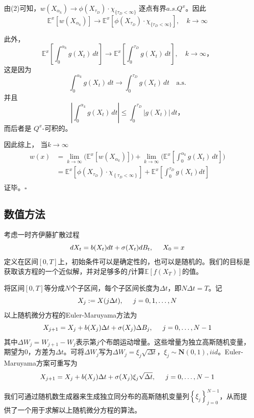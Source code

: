 \documentclass[UTF8，12pt]{ctexart}
\numberwithin{equation}{section}
\newcommand{\qed}{\hfill \ensuremath{\square}}
\begin{document}
由(2)可知，$w(X_{\alpha_k}) \to \phi(X_{\tau_D}) \cdot \chi_{\{\tau_D < \infty\}}$ 逐点有界$a.s.Q^x$。因此
\[
\mathbb{E}^x[w(X_{\alpha_k})] \to \mathbb{E}^x[\phi(X_{\tau_D}) \cdot \chi_{\{\tau_D < \infty\}}], \quad  k \to \infty
\]

此外，
\[
\mathbb{E}^x\left[ \int_0^{\alpha_k} g(X_t)\, dt \right] \to \mathbb{E}^x\left[ \int_0^{\tau_D} g(X_t)\, dt \right], \quad  k \to \infty， 
\]
这是因为
\[
\int_0^{\alpha_k} g(X_t)\, dt \to \int_0^{\tau_D} g(X_t)\, dt \quad \text{a.s.}
\]
并且
\[
\left| \int_0^{\alpha_k} g(X_t)\, dt \right| \leq \int_0^{\tau_D} |g(X_t)|\, dt，
\]
而后者是 $Q^x$-可积的。

因此综上， 当$k\to\infty$
\[
\begin{aligned}
	w(x)&= \lim_{k\to\infty}\Big(\mathbb{E}^x[w(X_{\alpha_k})]\Big) + \lim_{k\to\infty}\Big(\mathbb{E}^x\left[ \int_0^{\alpha_k} g(X_t)\, dt \right]\Big)\\
		&=\mathbb{E}^x\left[\phi(X_{\tau_D})\cdot\chi_{\left\{\tau_D<\infty\right\}}\right]+\mathbb{E}^x\left[\int_{0}^{\tau_D}g(X_t)dt\right]\\
\end{aligned}
\]
证毕。\qed
 
\subsection{数值方法}

考虑一时齐伊藤扩散过程
\[
dX_t=b(X_t)dt+\sigma(X_t)dB_t,\hspace{0.5cm}X_0=x
\]
定义在区间$[0,T]$上，初始条件可以是确定性的，也可以是随机的。我们的目标是获取该方程的一个近似解，并对足够多的$f$计算$\mathbb{E}[f(X_T)]$的值。

将区间$[0,T]$等分成$N$个子区间，每个子区间长度为$\Delta t$，即$N\Delta t=T$。记
\[
X_j:=X(j\Delta t),\hspace{0.5cm}j=0,1,\dots,N
\]
以上随机微分方程的Euler-Maruyama方法为
\[
X_{j+1}=X_j+b(X_j)\Delta t+\sigma(X_j)\Delta B_j,\hspace{0.5cm}j=0,\dots ,N-1
\]
其中$\Delta W_j=W_{j+1}-W_j$表示第$j$个布朗运动增量。这些增量为独立高斯随机变量，期望为$0$，方差为$\Delta t$。可将$\Delta W_j$写为$\Delta W_j=\xi_j\sqrt{\Delta t}$，$\xi_j\sim\mathbf{N}(0,1),iid$。Euler-Maruyama方案可重写为
\[
X_{j+1}=X_j+b(X_j)\Delta t+\sigma(X_j)\xi_j\sqrt{\Delta t},\hspace{0.5cm}j=0,\dots ,N-1
\]

我们可通过随机数生成器来生成独立同分布的高斯随机变量列$\left\{\xi_j\right\}_{j=0}^{N-1}$，从而提供了一个用于求解以上随机微分方程的算法。
\end{document}

